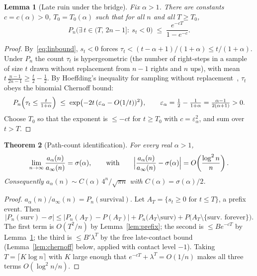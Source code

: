 \documentclass[11pt]{article}
\newtheorem{theorem}{Theorem}
\newtheorem{lemma}[theorem]{Lemma}
\theoremstyle{definition}
\theoremstyle{remark}
\begin{document}
\begin{lemma}[Late ruin under the bridge]\label{lem:bridgelate}
Fix $\alpha > 1$.
There are constants $c = c(\alpha) > 0$, $T_0 = T_0(\alpha)$ such that
for all $n$ and all $T \geq T_0$,
\[
P_n\bigl(\exists\, t \in (T,\, 2n-1]:\ s_t < 0\bigr)
\;\leq\; \frac{e^{-cT}}{1 - e^{-c}} .
\]
\end{lemma}

\begin{proof}
By~\eqref{eq:linbound}, $s_t < 0$ forces
$\tau_t < (t - \alpha + 1)/(1 + \alpha) \leq t/(1+\alpha)$.
Under $P_n$ the count $\tau_t$ is hypergeometric (the number of
right-steps in a sample of size $t$ drawn without replacement from
$n-1$ rights and $n$ ups), with mean
$t\,\frac{n-1}{2n-1} \geq \frac{t}{2} - \frac{1}{2}$.
By Hoeffding's inequality for sampling without
replacement~\cite{hoeffding}, $\tau_t$ obeys the binomial Chernoff
bound:
\[
P_n\Bigl(\tau_t \leq \tfrac{t}{1+\alpha}\Bigr)
\;\leq\; \exp\bigl(-2 t\,(\varepsilon_\alpha - O(1/t))^2\bigr),
\qquad
\varepsilon_\alpha = \tfrac12 - \tfrac{1}{1+\alpha}
= \tfrac{\alpha - 1}{2(\alpha+1)} > 0 .
\]
Choose $T_0$ so that the exponent is $\leq -ct$ for $t \geq T_0$ with
$c = \varepsilon_\alpha^2$, and sum over $t > T$.
\end{proof}

\begin{theorem}[Path-count identification]\label{thm:zero}
For every real $\alpha > 1$,
\[
\lim_{n \to \infty} \frac{a_\alpha(n)}{a_\infty(n)} = \sigma(\alpha),
\qquad\text{with}\qquad
\Bigl|\frac{a_\alpha(n)}{a_\infty(n)} - \sigma(\alpha)\Bigr|
= O\!\left(\frac{\log^2 n}{n}\right).
\]
Consequently $a_\alpha(n) \sim C(\alpha)\, 4^n/\sqrt{\pi n}$ with
$C(\alpha) = \sigma(\alpha)/2$.
\end{theorem}

\begin{proof}
$a_\alpha(n)/a_\infty(n) = P_n(\text{survival})$.
Let $A_T = \{s_t \geq 0 \text{ for } t \leq T\}$, a prefix event.
Then
\[
\bigl|P_n(\text{surv}) - \sigma\bigr|
\leq \bigl|P_n(A_T) - P(A_T)\bigr|
+ P_n\bigl(A_T \setminus \text{surv}\bigr)
+ P\bigl(A_T \setminus \{\text{surv. forever}\}\bigr).
\]
The first term is $O(T^2/n)$ by Lemma~\ref{lem:prefix}; the second is
$\leq B e^{-cT}$ by Lemma~\ref{lem:bridgelate}; the third is
$\leq B' \lambda^{T}$ by the free late-contact bound
(Lemma~\ref{lem:chernoff} below, applied with contact level $-1$).
Taking $T = \lceil K \log n \rceil$ with $K$ large enough that
$e^{-cT} + \lambda^T = O(1/n)$ makes all three terms
$O(\log^2 n / n)$.
\end{proof}
\end{document}
